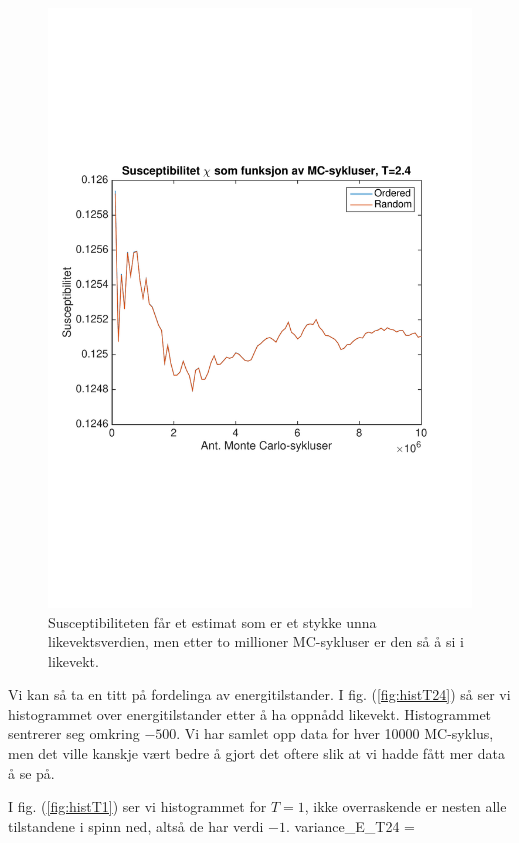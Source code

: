 \documentclass[norsk, 10pt]{article}
\begin{document}
\begin{figure}[H]
\centering
\includegraphics[scale = 0.6, trim = 1cm 8cm 1cm 8cm]{b_chi_MC_L2_T24.pdf}
\caption{Susceptibiliteten får et estimat som er et stykke unna likevektsverdien, men etter to millioner MC-sykluser er den så å si i likevekt.}
\label{fig:chiT24}
\end{figure}

Vi kan så ta en titt på fordelinga av energitilstander. I fig. (\ref{fig:histT24}) så ser vi histogrammet over energitilstander etter å ha oppnådd likevekt. Histogrammet sentrerer seg omkring $-500$. Vi har samlet opp data for hver 10000 MC-syklus, men det ville kanskje vært bedre å gjort det oftere slik at vi hadde fått mer data å se på.

I fig. (\ref{fig:histT1}) ser vi histogrammet for $T=1$, ikke overraskende er nesten alle tilstandene i spinn ned, altså de har verdi $-1$.
 variance_E_T24 =
\end{document}
